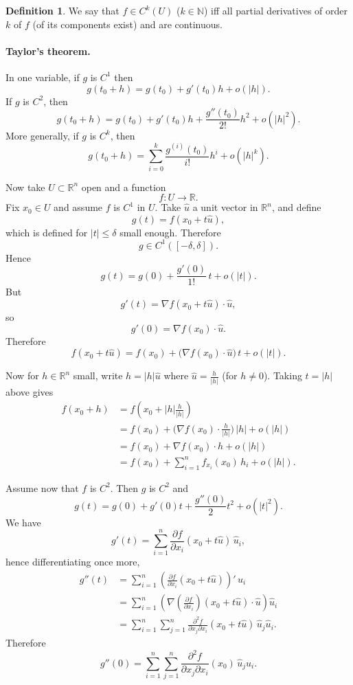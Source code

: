 \documentclass[11pt,a4paper]{article}
\theoremstyle{definition}
\newtheorem{definition}{Definition}[section]
\theoremstyle{plain}
\theoremstyle{remark}
\newcommand{\R}{\mathbb{R}}
\newcommand{\N}{\mathbb{N}}
\begin{document}
\begin{definition}
    We say that $f \in C^k(U)$ ($k \in \N$) iff all partial derivatives of order $k$ of $f$ (of its components exist) and are continuous.  
\end{definition}
\paragraph{Taylor's theorem.}
In one variable, if $g$ is $C^1$ then
\[
g(t_0+h)=g(t_0)+g'(t_0)h+o(|h|).
\]
If $g$ is $C^2$, then
\[
g(t_0+h)=g(t_0)+g'(t_0)h+\frac{g''(t_0)}{2!}h^2+o(|h|^2).
\]
More generally, if $g$ is $C^k$, then
\[
g(t_0+h)=\sum_{i=0}^k \frac{g^{(i)}(t_0)}{i!}h^i+o(|h|^k).
\]

Now take $U\subset \R^n$ open and a function
\[
f:U\to\R.
\]
Fix $x_0\in U$ and assume $f$ is $C^1$ in $U$. Take $\hat u$ a unit vector in $\R^n$, and define
\[
g(t)=f(x_0+t\hat u),
\]
which is defined for $|t|\le \delta$ small enough. Therefore
\[
g\in C^1([-\delta,\delta]).
\]
Hence
\[
g(t)=g(0)+\frac{g'(0)}{1!}\,t+o(|t|).
\]
But
\[
g'(t)=\nabla f(x_0+t\hat u)\cdot \hat u,
\]
so
\[
g'(0)=\nabla f(x_0)\cdot \hat u.
\]
Therefore
\[
f(x_0+t\hat u)=f(x_0)+\big(\nabla f(x_0)\cdot \hat u\big)\,t+o(|t|).
\]

Now for $h\in\R^n$ small, write $h=|h|\hat u$ where $\hat u=\frac{h}{|h|}$ (for $h\neq 0$). Taking $t=|h|$ above gives
\begin{align*}
f(x_0+h)
&=f\!\left(x_0+|h|\frac{h}{|h|}\right)\\
&=f(x_0)+\big(\nabla f(x_0)\cdot \tfrac{h}{|h|}\big)\,|h|+o(|h|)\\
&=f(x_0)+\nabla f(x_0)\cdot h+o(|h|)\\
&=f(x_0)+\sum_{i=1}^n f_{x_i}(x_0)\,h_i+o(|h|).
\end{align*}

\medskip

Assume now that $f$ is $C^2$. Then $g$ is $C^2$ and
\[
g(t)=g(0)+g'(0)t+\frac{g''(0)}{2}t^2+o(|t|^2).
\]
We have
\[
g'(t)=\sum_{i=1}^n \frac{\partial f}{\partial x_i}(x_0+t\hat u)\,\hat u_i,
\]
hence differentiating once more,
\begin{align*}
g''(t)
&=\sum_{i=1}^n \left(\frac{\partial f}{\partial x_i}(x_0+t\hat u)\right)'\,\hat u_i\\
&=\sum_{i=1}^n \left(\nabla\!\left(\frac{\partial f}{\partial x_i}\right)(x_0+t\hat u)\cdot \hat u\right)\hat u_i\\
&=\sum_{i=1}^n\sum_{j=1}^n \frac{\partial^2 f}{\partial x_j\partial x_i}(x_0+t\hat u)\,\hat u_j\hat u_i.
\end{align*}
Therefore
\[
g''(0)=\sum_{i=1}^n\sum_{j=1}^n \frac{\partial^2 f}{\partial x_j\partial x_i}(x_0)\,\hat u_j\hat u_i.
\]
\end{document}
